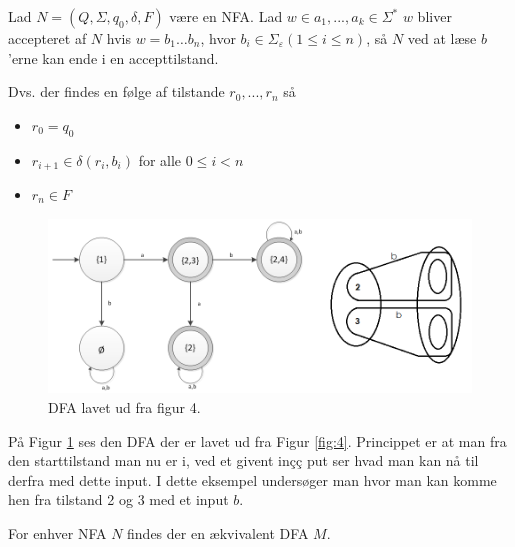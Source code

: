 \documentclass[a4paper,10pt,article]{memoir}
\begin{document}
\begin{definition}
Lad $N = (Q,\Sigma,q_0,\delta,F)$ være en NFA. Lad $w \in a_1, ... , a_k \in \Sigma^{\ast}$
$w$ bliver accepteret af $N$ hvis $w = b_1 \ldots b_n$, hvor $b_i \in \Sigma_\varepsilon (1 \leq i \leq n)$, så $N$ ved at læse $b$'erne kan ende i en accepttilstand.

Dvs. der findes en følge af tilstande $r_0, ... , r_n$ så

\begin{itemize}
\item $r_0 = q_0$
\item $r_{i+1} \in \delta(r_i,b_i)$ for alle $0 \leq i < n$
\item $r_n \in F$
\end{itemize}

\end{definition}

\begin{eksempel}

\begin{figure}[h]
\centering
\includegraphics[scale=0.8]{figur6.png}
\caption{DFA lavet ud fra figur 4.}
\label{fig:6}
\end{figure}

På Figur \ref{fig:6} ses den DFA der er lavet ud fra Figur \ref{fig:4}. Princippet er at man fra den starttilstand man nu er i, ved et givent inçç
put ser hvad man kan nå til derfra med dette input. I dette eksempel undersøger man hvor man kan komme hen fra tilstand 2 og 3 med et input $b$.
\end{eksempel}

\begin{saetning}
For enhver NFA $N$ findes der en ækvivalent DFA $M$.
\end{saetning}
\end{document}
